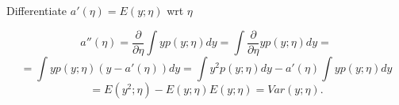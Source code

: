 \begin{answer}
Differentiate $a'(\eta)= E(y;\eta)$ wrt $\eta$

$$a''(\eta) = \frac{\partial}{\partial\eta}\int yp(y;\eta)dy =
\int \frac{\partial}{\partial\eta}yp(y;\eta) dy =  $$
$$= \int y p(y;\eta)(y - a'(\eta)) dy = \int y^2p(y;\eta) dy - 
a'(\eta)\int y p(y;\eta)dy$$
$$= E(y^2; \eta) - E(y; \eta) E(y; \eta) = Var(y;\eta).$$
\end{answer}
